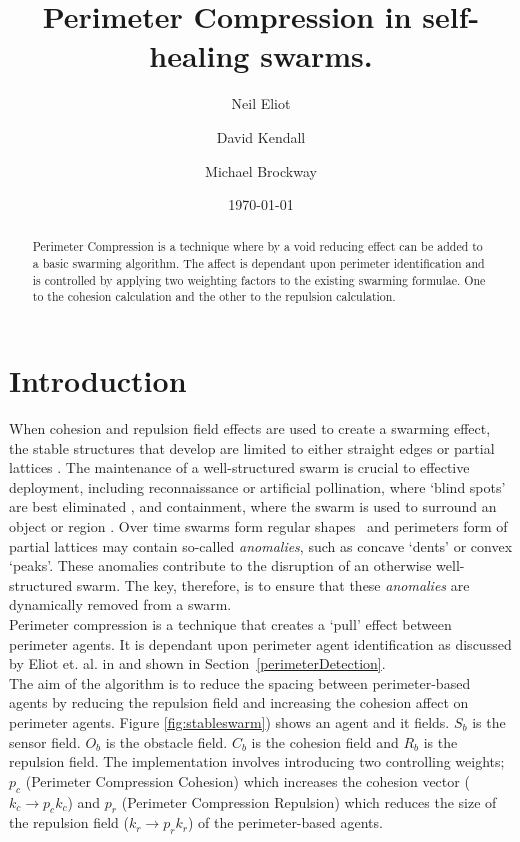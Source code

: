 \documentclass[12pt,a4paper]{IEEEtran}
\title{Perimeter Compression in self-healing swarms.}
\author[1,*]{Neil Eliot}
\author[2]{David Kendall}
\author[2]{Michael Brockway}
\affil[1] {Northumbria University, Faculty of Engineering and Environment, Department of Computer and Information Sciences}
\affil[2] {Hexham University, Faculty of Computer Science}
\affil[*] {Corresponding author: Dr Neil Eliot, neil.eliot@northumbria.ac.uk}
\date{\today}
\begin{document}
\maketitle

\begin{abstract}
Perimeter Compression is a technique where by a void reducing effect can be added to a basic swarming algorithm. The affect is dependant upon perimeter identification and is controlled by applying two weighting factors to the existing swarming formulae. One to the cohesion calculation and the other to the repulsion calculation.
\end{abstract}

\section{Introduction}
When cohesion and repulsion field effects are used to create a swarming effect, the stable structures that develop are limited to either straight edges or partial lattices \cite{eliot2017methods}. The maintenance of a well-structured swarm is crucial to effective deployment, including reconnaissance or artificial pollination, where `blind spots' are best  eliminated \cite{elamvazhuthi2015optimal}, and containment, where the swarm is used to surround an object or region \cite{cao2012distributed}. Over time swarms form regular shapes~\cite{RAZ:13} and perimeters form of partial lattices may contain so-called \textit{anomalies}, such as concave `dents' or convex `peaks'. These anomalies contribute to the disruption of an otherwise well-structured swarm. The key, therefore, is to ensure that these \textit{anomalies} are dynamically removed from a swarm.\\
Perimeter compression is a technique that creates a `pull' effect between perimeter agents. It is dependant upon perimeter agent identification as discussed by Eliot et. al. in \cite{eliot2017methods, eliot2018metric, eliot2019void} and shown in Section~\ref{perimeterDetection}.\\
The aim of the algorithm is to reduce the spacing between perimeter-based agents by reducing the repulsion field and increasing the cohesion affect on perimeter agents. Figure \ref{fig:stableswarm}) shows an agent and it fields. $S_b$ is the sensor field. $O_b$ is the obstacle field. $C_b$ is the cohesion field and $R_b$ is the repulsion field. The implementation involves introducing two controlling weights; $p_c$ (Perimeter Compression Cohesion) which increases the cohesion vector ($k_c\rightarrow p_ck_c$) and $p_r$ (Perimeter Compression Repulsion) which reduces the size of the repulsion field ($k_r\rightarrow p_rk_r$) of the perimeter-based agents.
\end{document}
